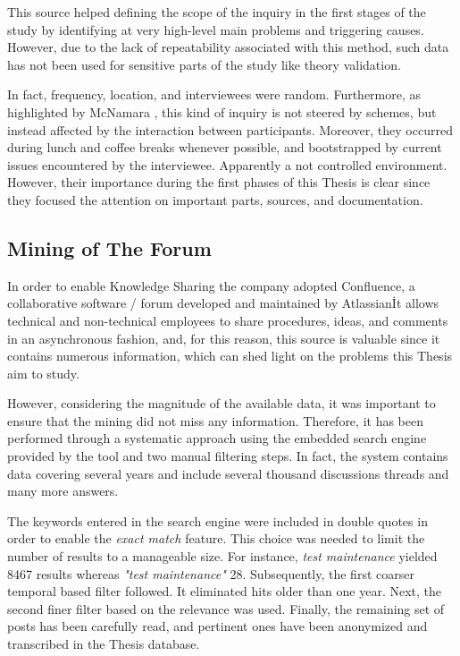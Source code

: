 This source helped defining the scope of the inquiry in the first stages of the study by identifying at very high-level main problems and triggering causes. However, due to the lack of repeatability associated with this method, such data has not been used for sensitive parts of the study like theory validation.

In fact, frequency, location, and interviewees were random. Furthermore, as highlighted by McNamara \cite{general_guidelines_for_interview}, this kind of inquiry is not steered by schemes, but instead affected by the interaction between participants. Moreover, they occurred during lunch and coffee breaks whenever possible, and bootstrapped by current issues encountered by the interviewee. Apparently a not controlled environment. However, their importance during the first phases of this Thesis is clear since they focused the attention on important parts, sources, and documentation.

\subsection{Mining of The Forum} \label{mining_forum}
In order to enable Knowledge Sharing the company adopted Confluence, a collaborative software / forum developed and maintained by Atlassian\texttrademark\. It allows technical and non-technical employees to share procedures, ideas, and comments in an asynchronous fashion, and, for this reason, this source is valuable since it contains numerous information, which can shed light on the problems this Thesis aim to study.

However, considering the magnitude of the available data, it was important to ensure that the mining did not miss any information. Therefore, it has been performed through a systematic approach using the embedded search engine provided by the tool and two manual filtering steps. In fact, the system contains data covering several years and include several thousand discussions threads and many more answers. 

The keywords entered in the search engine were included in double quotes in order to enable the \textit{exact match} feature. This choice was needed to limit the number of results to a manageable size. For instance, \textit{test maintenance} yielded 8467 results whereas \textit{"test maintenance"} 28. Subsequently, the first coarser temporal based filter followed. It eliminated hits older than one year. Next, the second finer filter based on the relevance was used. Finally, the remaining set of posts has been carefully read, and pertinent ones have been anonymized and transcribed in the Thesis database.

